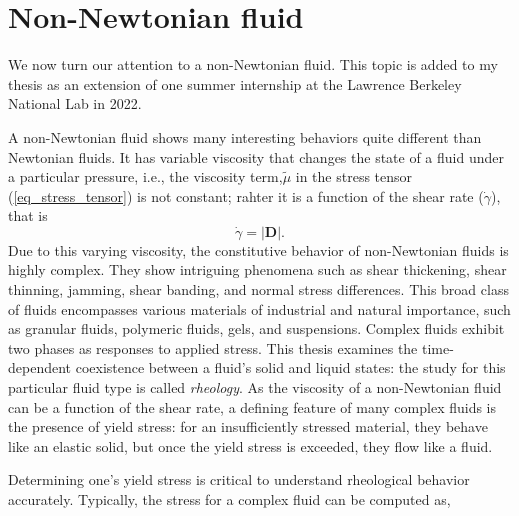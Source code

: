 \section{Non-Newtonian fluid}
We now turn our attention to a non-Newtonian fluid. This topic is added to my thesis as an extension of one summer internship at the Lawrence Berkeley National Lab in 2022. 
\par
A non-Newtonian fluid shows many interesting behaviors quite different than Newtonian fluids. It has variable viscosity that changes the state of a fluid under a particular pressure, i.e., the viscosity term,${\tilde{\mu}}$ in the stress tensor (\ref{eq_stress_tensor}) is not constant; rahter it is a function of the shear rate ($\dot{\gamma}$), that is
\begin{equation}
   \dot{\gamma} = \left| 
   {\boldsymbol{D}}
   \right|.
\end{equation}
Due to this varying viscosity, the constitutive behavior of non-Newtonian fluids is highly complex. They show intriguing phenomena such as shear thickening, shear thinning, jamming, shear banding, and normal stress differences. This broad class of fluids encompasses various materials of industrial and natural importance, such as granular fluids, polymeric fluids, gels, and suspensions. Complex fluids exhibit two phases as responses to applied stress. This thesis examines the time-dependent coexistence between a fluid's solid and liquid states: the study for this particular fluid type is called {\textit{rheology}}. As the viscosity of a non-Newtonian fluid can be a function of the shear rate, a defining feature of many complex fluids is the presence of yield stress: for an insufficiently stressed material, they behave like an elastic solid, but once the yield stress is exceeded, they flow like a fluid. 
\par
Determining one's yield stress is critical to understand rheological behavior accurately. Typically, the stress for a complex fluid can be computed as,
